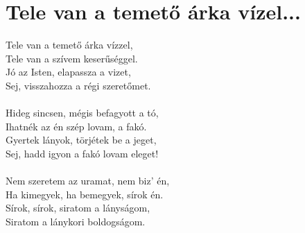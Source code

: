 \section{Tele van a temető árka vízel...}
Tele van a temető árka vízzel,\\
Tele van a szívem keserűséggel.\\
Jó az Isten, elapassza a vizet,\\
Sej, visszahozza a régi szeretőmet.\\\\
Hideg sincsen, mégis befagyott a tó,\\
Ihatnék az én szép lovam, a fakó.\\
Gyertek lányok, törjétek be a jeget,\\
Sej, hadd igyon a fakó lovam eleget!\\\\
Nem szeretem az uramat, nem biz’ én,\\
Ha kimegyek, ha bemegyek, sírok én.\\
Sírok, sírok, siratom a lányságom,\\
Siratom a lánykori boldogságom.\\
